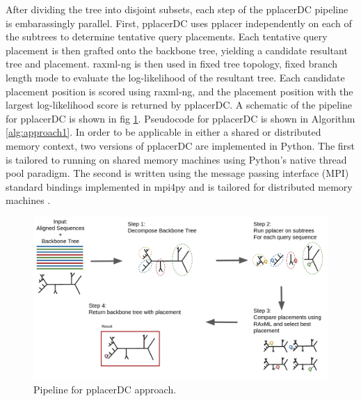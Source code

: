 \documentclass[10pt]{article}
\begin{document}
After dividing the tree into disjoint subsets, each step of the pplacerDC pipeline
is embarassingly parallel.
First, pplacerDC uses pplacer independently on each of the subtrees to determine tentative
query placements.
Each tentative query placement is then grafted onto the backbone tree, yielding a candidate
resultant tree and placement.
raxml-ng \cite{raxml} is then used in fixed tree topology, fixed branch length mode to evaluate
the log-likelihood of the resultant tree.
Each candidate placement position is scored using raxml-ng, and the placement position
with the largest log-likelihood score is returned by pplacerDC.
A schematic of the pipeline for pplacerDC is shown in fig \ref{fig:pplacerDC-pipeline}.
Pseudocode for pplacerDC is shown in Algorithm \ref{alg:approach1}.
In order to be applicable in either a shared or distributed memory context,
two versions of pplacerDC are implemented in Python.
The first is tailored to running on shared memory machines using Python's
native thread pool paradigm.
The second is written using the message passing interface (MPI) standard
bindings implemented in mpi4py and is tailored for distributed memory machines \cite{mpi4py-paper}.

\begin{figure}[h]
\centering
\includegraphics[width=\textwidth]{Figs/pplacerDCpipeline.png}
\caption{Pipeline for pplacerDC approach.}
\label{fig:pplacerDC-pipeline}
\end{figure}
\end{document}
